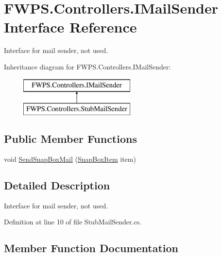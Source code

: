 \hypertarget{interface_f_w_p_s_1_1_controllers_1_1_i_mail_sender}{}\section{F\+W\+P\+S.\+Controllers.\+I\+Mail\+Sender Interface Reference}
\label{interface_f_w_p_s_1_1_controllers_1_1_i_mail_sender}


Interface for mail sender, not used.  


Inheritance diagram for F\+W\+P\+S.\+Controllers.\+I\+Mail\+Sender\+:\begin{figure}[H]
\begin{center}
\leavevmode
\includegraphics[height=2.000000cm]{interface_f_w_p_s_1_1_controllers_1_1_i_mail_sender}
\end{center}
\end{figure}
\subsection*{Public Member Functions}
\begin{DoxyCompactItemize}
\item 
void \mbox{\hyperlink{interface_f_w_p_s_1_1_controllers_1_1_i_mail_sender_a5d2d15273d1baa5c01bbe32db73d65a8}{Send\+Snap\+Box\+Mail}} (\mbox{\hyperlink{class_f_w_p_s_1_1_models_1_1_snap_box_item}{Snap\+Box\+Item}} item)
\end{DoxyCompactItemize}


\subsection{Detailed Description}
Interface for mail sender, not used. 

Definition at line 10 of file Stub\+Mail\+Sender.\+cs.



\subsection{Member Function Documentation}
\mbox{\label{interface_f_w_p_s_1_1_controllers_1_1_i_mail_sender_a5d2d15273d1baa5c01bbe32db73d65a8}} 
